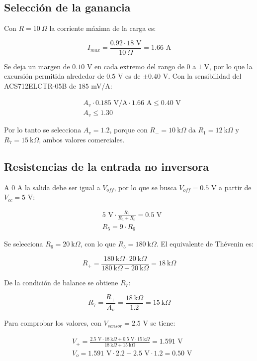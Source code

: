 \documentclass[spanish,10pt,a4paper,titlepage]{article}
\begin{document}
	\subsection{Selección de la ganancia}
	Con $R = 10\ \Omega$ la corriente máxima de la carga es:

	\[I_{max} = \frac{0.92 \cdot 18 \text{ V}}{10\ \Omega} = 1.66 \text{ A}\]

	Se deja un margen de $0.10$ V en cada extremo del rango de $0$ a $1$ V, por lo que la excursión permitida alrededor de $0.5$ V es de $\pm 0.40$ V. Con la sensibilidad del ACS712ELCTR-05B de $185$ mV/A:

	\begin{align*}
		&A_v \cdot 0.185 \text{ V/A} \cdot 1.66 \text{ A} \leq 0.40 \text{ V}\\
		&A_v \leq 1.30
	\end{align*}

	Por lo tanto se selecciona $A_v = 1.2$, porque con $R_- = 10\ \text{k}\Omega$ da $R_1 = 12\ \text{k}\Omega$ y $R_7 = 15\ \text{k}\Omega$, ambos valores comerciales.

	\subsection{Resistencias de la entrada no inversora}
	A $0$ A la salida debe ser igual a $V_{off}$, por lo que se busca $V_{off} = 0.5$ V a partir de $V_{cc} = 5$ V:

	\begin{align*}
		&5 \text{ V} \cdot \frac{R_6}{R_5 + R_6} = 0.5 \text{ V}\\
		&R_5 = 9 \cdot R_6
	\end{align*}

	Se selecciona $R_6 = 20\ \text{k}\Omega$, con lo que $R_5 = 180\ \text{k}\Omega$. El equivalente de Thévenin es:

	\[R_+ = \frac{180\ \text{k}\Omega \cdot 20\ \text{k}\Omega}{180\ \text{k}\Omega + 20\ \text{k}\Omega} = 18\ \text{k}\Omega\]

	De la condición de balance se obtiene $R_7$:

	\[R_7 = \frac{R_+}{A_v} = \frac{18\ \text{k}\Omega}{1.2} = 15\ \text{k}\Omega\]

	Para comprobar los valores, con $V_{sensor} = 2.5$ V se tiene:

	\begin{align*}
		&V_+ = \frac{2.5 \text{ V} \cdot 18\ \text{k}\Omega + 0.5 \text{ V} \cdot 15\ \text{k}\Omega}{18\ \text{k}\Omega + 15\ \text{k}\Omega} = 1.591 \text{ V}\\
		&V_o = 1.591 \text{ V} \cdot 2.2 - 2.5 \text{ V} \cdot 1.2 = 0.50 \text{ V}
	\end{align*}
\end{document}
